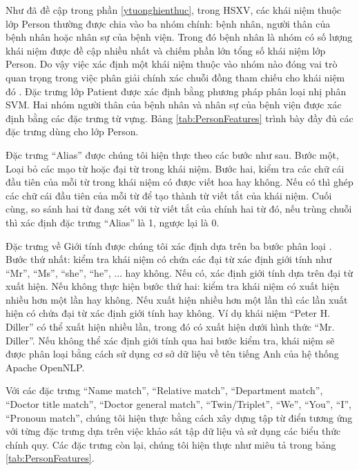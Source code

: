 Như đã đề cập trong phần \ref{ytuonghienthuc}, trong HSXV, các khái niệm thuộc lớp Person thường được chia vào ba nhóm chính: bệnh nhân, người thân của bệnh nhân hoặc nhân sự của bệnh viện. Trong đó bệnh nhân là nhóm có số lượng khái niệm được đề cập nhiều nhất và chiếm phần lớn tổng số khái niệm lớp Person. Do vậy việc xác định một khái niệm thuộc vào nhóm nào đóng vai trò quan trọng trong việc phân giải chính xác chuỗi đồng tham chiếu cho khái niệm đó \cite{YanXu2012}. Đặc trưng lớp Patient được xác định bằng phương pháp phân loại nhị phân SVM. Hai nhóm người thân của bệnh nhân và nhân sự của bệnh viện được xác định bằng các đặc trưng từ vựng. Bảng \ref{tab:PersonFeatures} trình bày đầy đủ các đặc trưng dùng cho lớp Person.

Đặc trưng ``Alias'' được chúng tôi hiện thực theo các bước như sau. Bước một, Loại bỏ các mạo từ hoặc đại từ trong khái niệm. Bước hai, kiểm tra các chữ cái đầu tiên của mỗi từ trong khái niệm có được viết hoa hay không. Nếu có thì ghép các chữ cái đầu tiên của mỗi từ để tạo thành từ viết tắt của khái niệm. Cuối cùng, so sánh hai từ đang xét với từ viết tắt của chính hai từ đó, nếu trùng chuỗi thì xác định đặc trưng ``Alias'' là 1, ngược lại là 0.

Đặc trưng về Giới tính được chúng tôi xác định dựa trên ba bước phân loại \cite{Soon2001}. Bước thứ nhất: kiểm tra khái niệm có chứa các đại từ xác định giới tính như ``Mr'', ``Ms'', ``she'', ``he'', ... hay không. Nếu có, xác định giới tính dựa trên đại từ xuất hiện. Nếu không thực hiện bước thứ hai: kiểm tra khái niệm có xuất hiện nhiều hơn một lần hay không. Nếu xuất hiện nhiều hơn một lần thì các lần xuất hiện có chứa đại từ xác định giới tính hay không. Ví dụ khái niệm ``Peter H. Diller'' có thể xuất hiện nhiều lần, trong đó có xuất hiện dưới hình thức ``Mr. Diller''. Nếu không thể xác định giới tính qua hai bước kiểm tra, khái niệm sẽ được phân loại bằng cách sử dụng cơ sở dữ liệu về tên tiếng Anh của hệ thống Apache OpenNLP.

Với các đặc trưng ``Name match'', ``Relative match'', ``Department match'', ``Doctor title match'', ``Doctor general match'', ``Twin/Triplet'', ``We'', ``You'', ``I'', ``Pronoun match'', chúng tôi hiện thực bằng cách xây dựng tập từ điển tương ứng với từng đặc trưng dựa trên việc khảo sát tập dữ liệu và sử dụng các biểu thức chính quy. Các đặc trưng còn lại, chúng tôi hiện thực như miêu tả trong bảng \ref{tab:PersonFeatures}.

